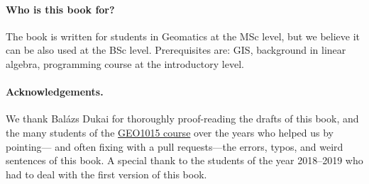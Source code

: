 \paragraph*{Who is this book for?}
The book is written for students in Geomatics at the MSc level, but we believe it can be also used at the BSc level.
Prerequisites are: GIS, background in linear algebra, programming course at the introductory level.


\paragraph*{Acknowledgements.}
We thank Balázs Dukai for thoroughly proof-reading the drafts of this book, and the many students of the \href{https://3d.bk.tudelft.nl/courses/geo1015}{GEO1015 course} over the years who helped us by pointing--- and often fixing with a pull requests---the errors, typos, and weird sentences of this book. 
A special thank to the students of the year 2018--2019 who had to deal with the first version of this book.






